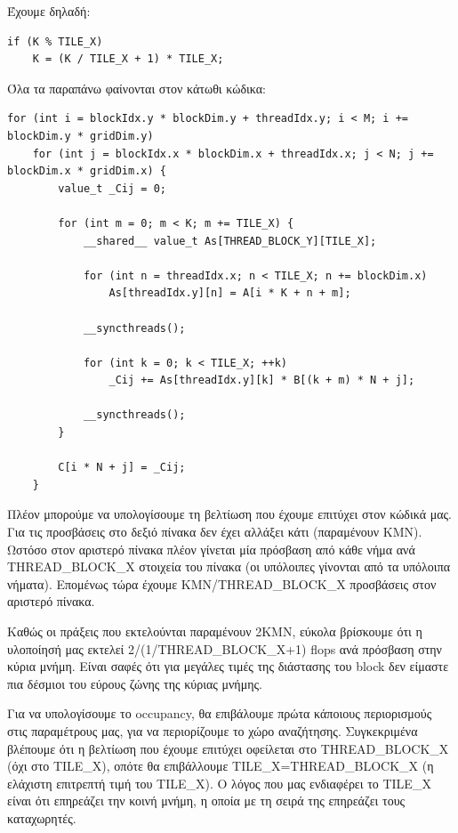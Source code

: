 \documentclass[titlepage]{article}
\begin{document}
Έχουμε δηλαδή:

\begin{verbatim}
if (K % TILE_X)
    K = (K / TILE_X + 1) * TILE_X;
\end{verbatim}

Όλα τα παραπάνω φαίνονται στον κάτωθι κώδικα:

\begin{verbatim}
for (int i = blockIdx.y * blockDim.y + threadIdx.y; i < M; i += blockDim.y * gridDim.y)
    for (int j = blockIdx.x * blockDim.x + threadIdx.x; j < N; j += blockDim.x * gridDim.x) {
        value_t _Cij = 0;

        for (int m = 0; m < K; m += TILE_X) {
            __shared__ value_t As[THREAD_BLOCK_Y][TILE_X];

            for (int n = threadIdx.x; n < TILE_X; n += blockDim.x)
                As[threadIdx.y][n] = A[i * K + n + m];

            __syncthreads();

            for (int k = 0; k < TILE_X; ++k)
                _Cij += As[threadIdx.y][k] * B[(k + m) * N + j];

            __syncthreads();
        }

        C[i * N + j] = _Cij;
    }
\end{verbatim}

Πλέον μπορούμε να υπολογίσουμε τη βελτίωση που έχουμε επιτύχει στον κώδικά μας. Για τις προσβάσεις στο δεξιό πίνακα δεν έχει αλλάξει κάτι (παραμένουν KMN). Ωστόσο στον αριστερό πίνακα πλέον γίνεται μία πρόσβαση από κάθε νήμα ανά THREAD\_BLOCK\_X στοιχεία του πίνακα (οι υπόλοιπες γίνονται από τα υπόλοιπα νήματα). Επομένως τώρα έχουμε KMN/THREAD\_BLOCK\_X προσβάσεις στον αριστερό πίνακα.

Καθώς οι πράξεις που εκτελούνται παραμένουν 2ΚΜΝ, εύκολα βρίσκουμε ότι η υλοποίησή μας εκτελεί 2/(1/THREAD\_BLOCK\_X+1) flops ανά πρόσβαση στην κύρια μνήμη. Είναι σαφές ότι για μεγάλες τιμές της διάστασης του block δεν είμαστε πια δέσμιοι του εύρους ζώνης της κύριας μνήμης.

Για να υπολογίσουμε το occupancy, θα επιβάλουμε πρώτα κάποιους περιορισμούς στις παραμέτρους μας, για να περιορίζουμε το χώρο αναζήτησης. Συγκεκριμένα βλέπουμε ότι η βελτίωση που έχουμε επιτύχει οφείλεται στο THREAD\_BLOCK\_X (όχι στο TILE\_X), οπότε θα επιβάλλουμε TILE\_X=THREAD\_BLOCK\_X (η ελάχιστη επιτρεπτή τιμή του TILE\_X). Ο λόγος που μας ενδιαφέρει το TILE\_X είναι ότι επηρεάζει την κοινή μνήμη, η οποία με τη σειρά της επηρεάζει τους καταχωρητές.
\end{document}
